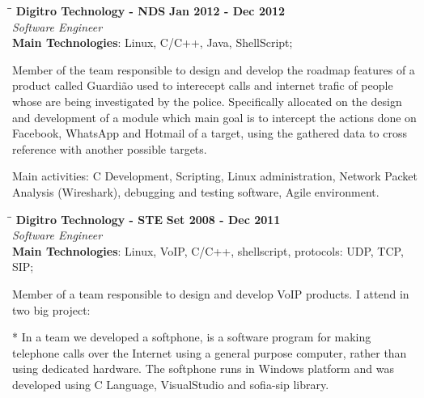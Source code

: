\documentclass[margin]{res}
\begin{document}
\begin{resume}
   \begin{tabbing}
   \hspace{2.3in}\= \hspace{1.7in}\= \kill %
    \textbf{Digitro Technology - NDS}    \>\>\textbf{Jan 2012 - Dec 2012}\\
    \textit{Software Engineer}\\   
    \textbf{Main Technologies}: Linux, C/C++, Java, ShellScript;
   \end{tabbing}\vspace{-20pt}      %
    \vspace{2mm}
    Member of the team responsible to design and develop the roadmap features of a product called
    Guardião used to interecept calls and internet trafic of people whose are being investigated by the police. 
    Specifically allocated on the design and development of a module which main goal is to intercept the actions 
    done on Facebook, WhatsApp and Hotmail of a target, using the gathered data to cross reference with another
    possible targets.

    Main activities: C Development, Scripting, Linux administration, Network Packet Analysis (Wireshark), debugging 
    and testing software, Agile environment.
   
   \vspace{20mm}
   \begin{tabbing}
   \hspace{2.3in}\= \hspace{1.5in}\= \kill %
    \textbf{Digitro Technology - STE}    \>\>\textbf{Set 2008 - Dec 2011}\\
    \textit{Software Engineer}\\   
    \textbf{Main Technologies}: Linux, VoIP, C/C++, shellscript, protocols: UDP, TCP, SIP;
   \end{tabbing}\vspace{-20pt}      %
    \vspace{2mm}
    
    Member of a team responsible to design and develop VoIP products. I attend in two big project:

      * In a team we developed a softphone, is a software program for making telephone calls over the Internet using a 
        general purpose computer, rather than using dedicated hardware. The softphone runs in Windows platform and was
        developed using C Language, VisualStudio and sofia-sip library.


\end{resume}
\end{document}
